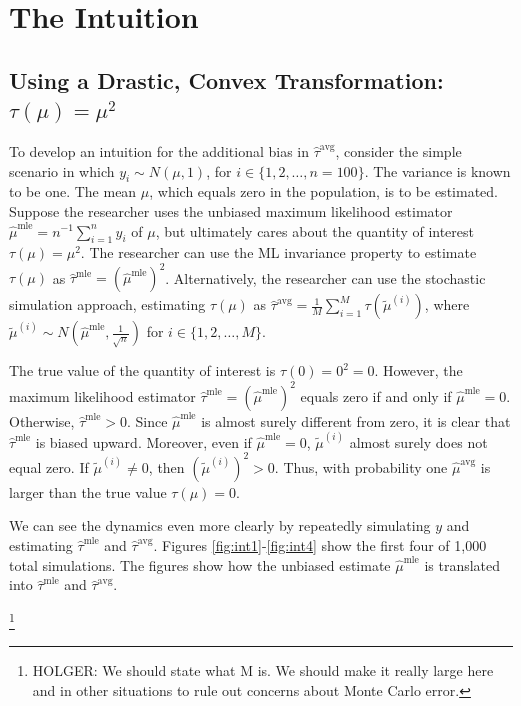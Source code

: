 \documentclass[11pt]{article}
\begin{document}
\section*{The Intuition}

\subsection*{Using a Drastic, Convex Transformation: $\tau(\mu) = \mu^2$}

To develop an intuition for the additional bias in $\hat{\tau}^\text{avg}$, consider the simple scenario in which $y_i \sim N(\mu, 1)$, for $i \in \{1, 2, \ldots, n = 100\}$.
The variance is known to be one.
The mean $\mu$, which equals zero in the population, is to be estimated.
Suppose the researcher uses the unbiased maximum likelihood estimator $\hat{\mu}^\text{mle} = n^{-1}\sum_{i=1}^n y_i$ of $\mu$, but ultimately cares about the quantity of interest $\tau(\mu) = \mu^2$.
The researcher can use the ML invariance property to estimate $\tau(\mu)$ as $\hat{\tau}^\text{mle} = \left( \hat{\mu}^\text{mle} \right) ^2$.
Alternatively, the researcher can use the stochastic simulation approach, estimating $\tau(\mu)$ as $\hat{\tau}^\text{avg} = \frac{1}{M} \sum_{i = 1}^M \tau \left( \tilde{\mu}^{(i)} \right)$, where $\tilde{\mu}^{(i)} \sim N \left( \hat{\mu}^\text{mle}, \frac{1}{\sqrt{n}} \right)$ for $i \in \{1, 2,\ldots, M\}$.

The true value of the quantity of interest is $\tau(0) = 0^2 = 0$.
However, the maximum likelihood estimator $\hat{\tau}^\text{mle} = \left( \hat{\mu}^\text{mle} \right)^2$ equals zero if and only if $\hat{\mu}^\text{mle} = 0$.
Otherwise, $\hat{\tau}^\text{mle} > 0$.
Since $\hat{\mu}^\text{mle}$ is almost surely different from zero, it is clear that $\hat{\tau}^\text{mle}$ is biased upward.
Moreover, even if $\hat{\mu}^\text{mle} = 0$, $\tilde{\mu}^{(i)}$ almost surely does not equal zero.
If $\tilde{\mu}^{(i)} \neq 0$, then $\left( \tilde{\mu}^{(i)} \right)^2 > 0$.
Thus, with probability one $\hat{\mu}^\text{avg}$ is larger than the true value $\tau(\mu) = 0$.

We can see the dynamics even more clearly by repeatedly simulating $y$ and estimating $\hat{\tau}^\text{mle}$ and $\hat{\tau}^\text{avg}$.
Figures \ref{fig:int1}-\ref{fig:int4} show the first four of 1,000 total simulations.
The figures show how the unbiased estimate $\hat{\mu}^\text{mle}$ is translated into $\hat{\tau}^\text{mle}$ and $\hat{\tau}^\text{avg}$.

\footnote{\color{red} HOLGER: We should state what M is.
We should make it really large here and in other situations to rule out concerns about Monte Carlo error.}
\end{document}
